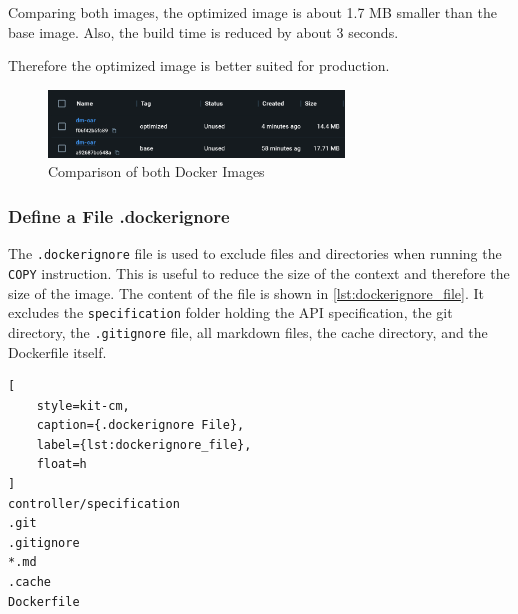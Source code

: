Comparing both images, the optimized image is about 1.7 MB smaller than the base image.
Also, the build time is reduced by about 3 seconds.

Therefore the optimized image is better suited for production.

\begin{figure}
    \centering
    \includegraphics[width=0.7\textwidth]{figures/microservices/dmCar/ms_dmCar_optimizedComparison.png}
    \caption{Comparison of both Docker Images}
    \label{fig:docker_image_comparison}
\end{figure}

\subsubsection*{Define a File .dockerignore}
The \texttt{.dockerignore} file is used to exclude files and directories when running the \texttt{COPY} instruction.
This is useful to reduce the size of the context and therefore the size of the image.
The content of the file is shown in \autoref*{lst:dockerignore_file}.
It excludes the \texttt{specification} folder holding the API specification, the git directory, the \texttt{.gitignore} file, all markdown files, the cache directory, and the Dockerfile itself.

\begin{lstlisting}[
    style=kit-cm,
    caption={.dockerignore File},
    label={lst:dockerignore_file},
    float=h
]
controller/specification
.git
.gitignore
*.md
.cache
Dockerfile
\end{lstlisting}